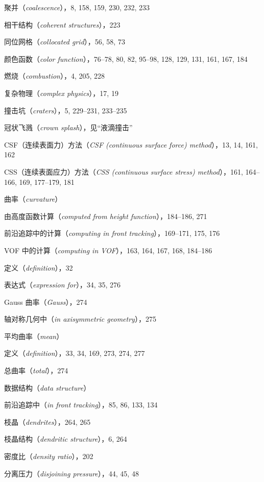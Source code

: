 \documentclass[11pt,a4paper,openany,fontset=none]{ctexbook}
\begin{document}
聚并（\textit{coalescence}），8, 158, 159, 230, 232, 233\par
相干结构（\textit{coherent structures}），223\par
同位网格（\textit{collocated grid}），56, 58, 73\par
颜色函数（\textit{color function}），76--78, 80, 82, 95--98, 128, 129, 131, 161, 167, 184\par
燃烧（\textit{combustion}），4, 205, 228\par
复杂物理（\textit{complex physics}），17, 19\par
撞击坑（\textit{craters}），5, 229--231, 233--235\par
冠状飞溅（\textit{crown splash}），见“液滴撞击”\par
CSF（连续表面力）方法（\textit{CSF (continuous surface force) method}），13, 14, 161, 162\par
CSS（连续表面应力）方法（\textit{CSS (continuous surface stress) method}），161, 164--166, 169, 177--179, 181\par
曲率（\textit{curvature}）\par
由高度函数计算（\textit{computed from height function}），184--186, 271\par
前沿追踪中的计算（\textit{computing in front tracking}），169--171, 175, 176\par
VOF 中的计算（\textit{computing in VOF}），163, 164, 167, 168, 184--186\par
定义（\textit{definition}），32\par
表达式（\textit{expression for}），34, 35, 276\par
Gauss 曲率（\textit{Gauss}），274\par
轴对称几何中（\textit{in axisymmetric geometry}），275\par
平均曲率（\textit{mean}）\par
定义（\textit{definition}），33, 34, 169, 273, 274, 277\par
总曲率（\textit{total}），274\par
数据结构（\textit{data structure}）\par
前沿追踪中（\textit{in front tracking}），85, 86, 133, 134\par
枝晶（\textit{dendrites}），264, 265\par
枝晶结构（\textit{dendritic structure}），6, 264\par
密度比（\textit{density ratio}），202\par
分离压力（\textit{disjoining pressure}），44, 45, 48\par
\end{document}
